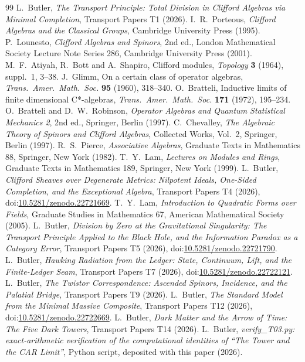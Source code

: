 \documentclass[11pt]{article}
\theoremstyle{definition}
\theoremstyle{plain}
\begin{document}
\begin{thebibliography}{99}
 L.~Butler,
\emph{The Transport Principle: Total Division in Clifford Algebras via Minimal Completion},
Transport Papers T1 (2026).
 I.~R.~Porteous,
\emph{Clifford Algebras and the Classical Groups},
Cambridge University Press (1995).
 P.~Lounesto,
\emph{Clifford Algebras and Spinors}, 2nd ed.,
London Mathematical Society Lecture Note Series 286, Cambridge University Press (2001).
 M.~F.~Atiyah, R.~Bott and A.~Shapiro,
Clifford modules,
\emph{Topology} \textbf{3} (1964), suppl.~1, 3--38.
 J.~Glimm,
On a certain class of operator algebras,
\emph{Trans.\ Amer.\ Math.\ Soc.} \textbf{95} (1960), 318--340.
 O.~Bratteli,
Inductive limits of finite dimensional C*-algebras,
\emph{Trans.\ Amer.\ Math.\ Soc.} \textbf{171} (1972), 195--234.
 O.~Bratteli and D.~W.~Robinson,
\emph{Operator Algebras and Quantum Statistical Mechanics 2}, 2nd ed.,
Springer, Berlin (1997).
 C.~Chevalley,
\emph{The Algebraic Theory of Spinors and Clifford Algebras},
Collected Works, Vol.~2, Springer, Berlin (1997).
 R.~S.~Pierce,
\emph{Associative Algebras},
Graduate Texts in Mathematics 88, Springer, New York (1982).
 T.~Y.~Lam,
\emph{Lectures on Modules and Rings},
Graduate Texts in Mathematics 189, Springer, New York (1999).
 L.~Butler,
\emph{Clifford Sheaves over Degenerate Metrics: Nilpotent Ideals, One-Sided Completion, and the Exceptional Algebra},
Transport Papers T4 (2026), doi:\href{https://doi.org/10.5281/zenodo.22721669}{10.5281/zenodo.22721669}.
 T.~Y.~Lam,
\emph{Introduction to Quadratic Forms over Fields},
Graduate Studies in Mathematics 67, American Mathematical Society (2005).
 L.~Butler,
\emph{Division by Zero at the Gravitational Singularity: The Transport Principle Applied to the Black Hole, and the Information Paradox as a Category Error},
Transport Papers T5 (2026), doi:\href{https://doi.org/10.5281/zenodo.22721790}{10.5281/zenodo.22721790}.
 L.~Butler,
\emph{Hawking Radiation from the Ledger: State, Continuum, Lift, and the Finite-Ledger Seam},
Transport Papers T7 (2026), doi:\href{https://doi.org/10.5281/zenodo.22722121}{10.5281/zenodo.22722121}.
 L.~Butler,
\emph{The Twistor Correspondence: Ascended Spinors, Incidence, and the Palatial Bridge},
Transport Papers T9 (2026).
 L.~Butler,
\emph{The Standard Model from the Minimal Massive Composite},
Transport Papers T12 (2026), doi:\href{https://doi.org/10.5281/zenodo.22722669}{10.5281/zenodo.22722669}.
 L.~Butler,
\emph{Dark Matter and the Arrow of Time: The Five Dark Towers},
Transport Papers T14 (2026).
 L.~Butler,
\emph{verify\_T03.py: exact-arithmetic verification of the computational identities of ``The Tower and the CAR Limit''},
Python script, deposited with this paper (2026).
\end{thebibliography}
\end{document}
